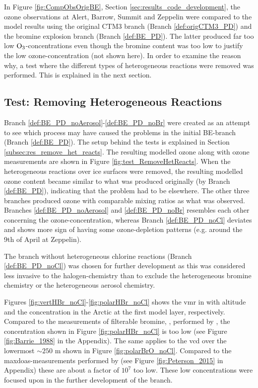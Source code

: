 In Figure \ref{fig:CompObsOrigBE}, Section \ref{sec:results_code_development}, the ozone observations at Alert, Barrow, Summit and Zeppelin were compared to the model results using the original CTM3 branch (Branch \ref{def:origCTM3_PD}) and the bromine explosion branch (Branch \ref{def:BE_PD}). The latter produced far too low $\mathrm{O_3}$-concentrations even though the bromine content was too low to justify the low ozone-concentration (not shown here). In order to examine the reason why, a test where the different types of heterogeneous reactions were removed was performed. This is explained in the next section. 

\subsection{Test: Removing Heterogeneous Reactions}

Branch \ref{def:BE_PD_noAerosol}-\ref{def:BE_PD_noBr} were created as an attempt to see which process may have caused the problems in the initial BE-branch (Branch \ref{def:BE_PD}). The setup behind the tests is explained in Section \ref{subsec:res_remove_het_reacts}. The resulting modelled ozone along with ozone measurements are shown in Figure \ref{fig:test_RemoveHetReacts}. When the heterogeneous reactions over ice surfaces were removed, the resulting modelled ozone content became similar to what was produced originally (by Branch \ref{def:BE_PD}), indicating that the problem had to be elsewhere. The other three branches produced ozone with comparable mixing ratios as what was observed. Branches \ref{def:BE_PD_noAerosol} and \ref{def:BE_PD_noBr} resembles each other concerning the ozone-concentration, whereas Branch \ref{def:BE_PD_noCl} deviates and shows more sign of having some ozone-depletion patterns (e.g. around the 9th of April at Zeppelin). 

\medskip

The branch without heterogeneous chlorine reactions (Branch \ref{def:BE_PD_noCl}) was chosen for further development as this was considered less invasive to the halogen-chemistry than to exclude the heterogeneous bromine chemistry or the heterogeneous aerosol chemistry. 

\medskip

Figures \ref{fig:vertHBr_noCl}-\ref{fig:polarHBr_noCl} shows the \acrfull{vmr} in with altitude and the concentration in the Arctic at the first model layer, respectively. Compared to the measurements of filterable bromine, , performed by \cite{barrie}, the concentration shown in Figure \ref{fig:polarHBr_noCl} is too low (see Figure \ref{fig:Barrie_1988} in the Appendix). The same applies to the  \acrshort{vcd} over the lowermost $\sim 250$ m shown in Figure \ref{fig:polarBrO_noCl}. Compared to the \acrshort{maxdoas}-measurements performed by \cite{Peterson2015} (see Figure \ref{fig:Peterson_2015} in Appendix) these are about a factor of $10^7$ too low. These low concentrations were focused upon in the further development of the branch. 



